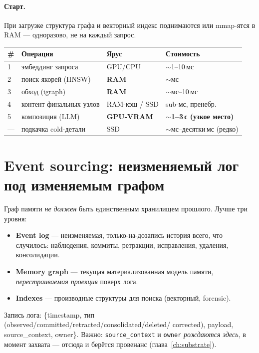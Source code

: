\paragraph{Старт.} При загрузке структура графа и векторный индекс поднимаются или
mmap-ятся в RAM — одноразово, не на каждый запрос.

\begin{center}
\begin{tabular}{p{} p{} p{} p{}}
\toprule
\# & \textbf{Операция} & \textbf{Ярус} & \textbf{Стоимость} \\
\midrule
1 & эмбеддинг запроса & GPU/CPU & $\sim$1--10\,мс \\
2 & поиск якорей (HNSW) & \textbf{RAM} & $\sim$мс \\
3 & обход (igraph) & \textbf{RAM} & $\sim$мс--10\,мс \\
4 & контент финальных узлов & RAM-кэш / SSD & sub-мс, пренебр. \\
5 & композиция (LLM) & \textbf{GPU-VRAM} & \textbf{$\sim$1--3\,с (узкое место)} \\
— & подкачка cold-детали & SSD & $\sim$мс--десятки\,мс (редко) \\
\bottomrule
\end{tabular}
\end{center}

\section{Event sourcing: неизменяемый лог под изменяемым графом}
\label{sec:eventlog}

Граф памяти \emph{не должен} быть единственным хранилищем прошлого. Лучше три уровня:
\begin{itemize}\itemsep1pt
\item \textbf{Event log} — неизменяемая, только-на-дозапись история всего, что
случилось: наблюдения, коммиты, ретракции, исправления, удаления, консолидации.
\item \textbf{Memory graph} — текущая материализованная модель памяти,
\emph{перестраиваемая проекция} поверх лога.
\item \textbf{Indexes} — производные структуры для поиска (векторный, forensic).
\end{itemize}
Запись лога: \{timestamp, тип (observed/committed/retracted/consolidated/deleted/
corrected), payload, source\_context, owner\}. Важно: \texttt{source\_context} и
\texttt{owner} \emph{рождаются здесь}, в момент захвата — отсюда и берётся провенанс
(глава~\ref{ch:substrate}).

